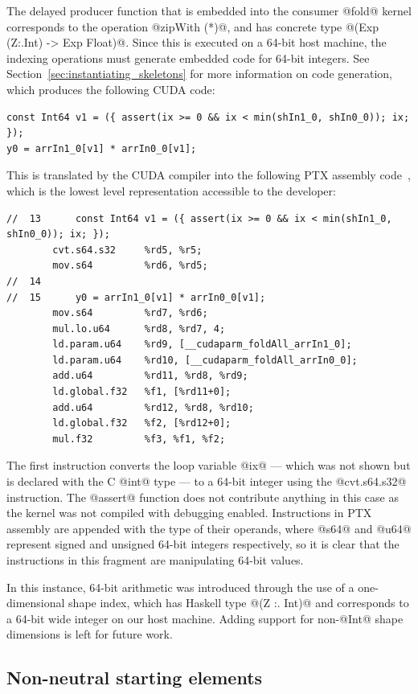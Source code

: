 The delayed producer function that is embedded into the consumer @fold@ kernel
corresponds to the operation @zipWith (*)@, and has concrete type
@(Exp (Z:.Int) -> Exp Float)@. Since this is executed on a 64-bit host machine,
the indexing operations must generate embedded code for 64-bit integers. See
Section~\ref{sec:instantiating_skeletons} for more information on code
generation, which produces the following CUDA code:
%
\begin{lstlisting}[style=haskell]
const Int64 v1 = ({ assert(ix >= 0 && ix < min(shIn1_0, shIn0_0)); ix; });
y0 = arrIn1_0[v1] * arrIn0_0[v1];
\end{lstlisting}
%
This is translated by the CUDA compiler into the following PTX assembly
code~\cite{NVIDIA:2012vj}, which is the lowest level representation accessible
to the developer:
%
\begin{lstlisting}[style=ptx]
//  13      const Int64 v1 = ({ assert(ix >= 0 && ix < min(shIn1_0, shIn0_0)); ix; });
        cvt.s64.s32     %rd5, %r5;
        mov.s64         %rd6, %rd5;
//  14
//  15      y0 = arrIn1_0[v1] * arrIn0_0[v1];
        mov.s64         %rd7, %rd6;
        mul.lo.u64      %rd8, %rd7, 4;
        ld.param.u64    %rd9, [__cudaparm_foldAll_arrIn1_0];
        ld.param.u64    %rd10, [__cudaparm_foldAll_arrIn0_0];
        add.u64         %rd11, %rd8, %rd9;
        ld.global.f32   %f1, [%rd11+0];
        add.u64         %rd12, %rd8, %rd10;
        ld.global.f32   %f2, [%rd12+0];
        mul.f32         %f3, %f1, %f2;
\end{lstlisting}
%
The first instruction converts the loop variable @ix@ --- which was not shown
but is declared with the C @int@ type --- to a 64-bit integer using the
@cvt.s64.s32@ instruction. The @assert@ function does not contribute anything in
this case as the kernel was not compiled with debugging enabled. Instructions in
PTX assembly are appended with the type of their operands, where @s64@ and @u64@
represent signed and unsigned 64-bit integers respectively, so it is clear that
the instructions in this fragment are manipulating 64-bit values.

In this instance, 64-bit arithmetic was introduced through the use of a
one-dimensional shape index, which has Haskell type @(Z :. Int)@ and corresponds
to a 64-bit wide integer on our host machine. Adding support for non-@Int@ shape
dimensions is left for future work.


\subsection{Non-neutral starting elements}
\label{sec:non-neutral_starting_elements}

